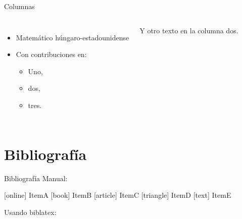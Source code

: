 \documentclass[aspectratio=169,usenames,dvipsnames,svgnames,table]{beamer}
\begin{document}
\begin{frame}{Columnas}
\begin{columns}

\begin{itemize}
 \item Matemático húngaro-estadounidense
 \item Con contribuciones en:
 \begin{itemize}
  \item Uno,
  \item dos,
  \item tres.
 \end{itemize}
\end{itemize}

 
 Y otro texto en la columna dos.
\end{columns}
\end{frame}




\section{Bibliografía}
\begin{frame}[allowframebreaks]{Bibliografía}
Manual:
\begin{thebibliography}{9}
[online]
 ItemA
[book]
 ItemB
[article]
 ItemC
[triangle]
 ItemD
[text]
 ItemE
\end{thebibliography}

\vspace*{2ex}
Usando biblatex:
\printbibliography
\end{frame}
\end{document}
